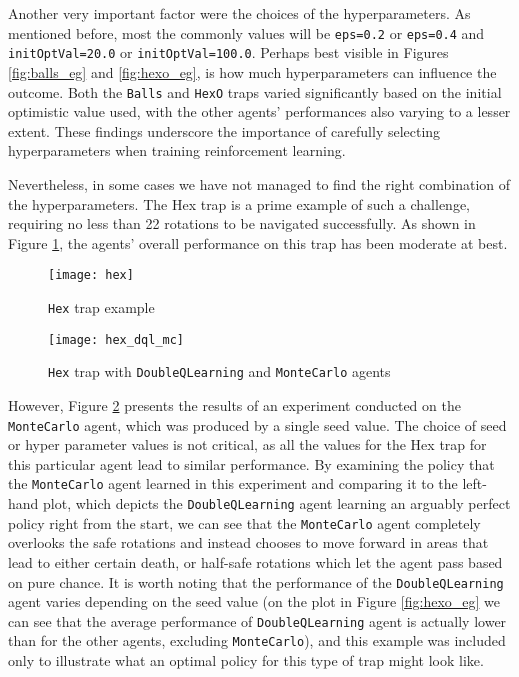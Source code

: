 Another very important factor were the choices of the hyperparameters. As mentioned before, most the commonly values will be \texttt{eps=0.2} or \texttt{eps=0.4} and \texttt{initOptVal=20.0} or \texttt{initOptVal=100.0}. Perhaps best visible in Figures \ref{fig:balls_eg} and \ref{fig:hexo_eg}, is how much hyperparameters can influence the outcome. Both the \texttt{Balls} and \texttt{HexO} traps varied significantly based on the initial optimistic value used, with the other agents' performances also varying to a lesser extent. These findings underscore the importance of carefully selecting hyperparameters when training reinforcement learning.

Nevertheless, in some cases we have not managed to find the right combination of the hyperparameters. The Hex trap is a prime example of such a challenge, requiring no less than 22 rotations to be navigated successfully. As shown in Figure \ref{fig:hex_eg}, the agents' overall performance on this trap has been moderate at best.

\begin{figure}[h]
    \centering
    \texttt{[image: hex]}
    \caption{\texttt{Hex} trap example}
    \label{fig:hex_eg}
\end{figure}

\begin{figure}[h]
    \centering
    \texttt{[image: hex\_dql\_mc]}
    \caption{\texttt{Hex} trap with \texttt{DoubleQLearning} and \texttt{MonteCarlo} agents}
    \label{fig:hex_diff_eg}
\end{figure}

However, Figure \ref{fig:hex_diff_eg} presents the results of an experiment conducted on the \texttt{MonteCarlo} agent, which was produced by a single seed value. The choice of seed or hyper parameter values is not critical, as all the values for the Hex trap for this particular agent lead to similar performance. By examining the policy that the \texttt{MonteCarlo} agent learned in this experiment and comparing it to the left-hand plot, which depicts the \texttt{DoubleQLearning} agent learning an arguably perfect policy right from the start, we can see that the \texttt{MonteCarlo} agent completely overlooks the safe rotations and instead chooses to move forward in areas that lead to either certain death, or half-safe rotations which let the agent pass based on pure chance. It is worth noting that the performance of the \texttt{DoubleQLearning} agent varies depending on the seed value (on the plot in Figure \ref{fig:hexo_eg} we can see that the average performance of \texttt{DoubleQLearning} agent is actually lower than for the other agents, excluding \texttt{MonteCarlo}), and this example was included only to illustrate what an optimal policy for this type of trap might look like.

